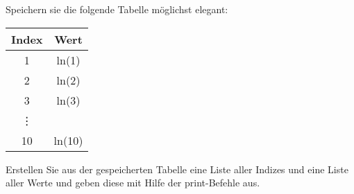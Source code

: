\begin{aufg}[0]
Speichern sie die folgende Tabelle möglichst elegant:
\begin{center}
\begin{tabular}[c]{cc}
  Index & Wert\\
  \hline
  1 & ln(1)\\
  2 & ln(2)\\
  3 & ln(3)\\
  \vdots\\
  10 & ln(10)\\
\end{tabular}
\end{center}
Erstellen Sie aus der gespeicherten Tabelle eine Liste aller Indizes und eine Liste aller Werte und geben diese 
mit Hilfe der print-Befehle aus.

\end{aufg}
